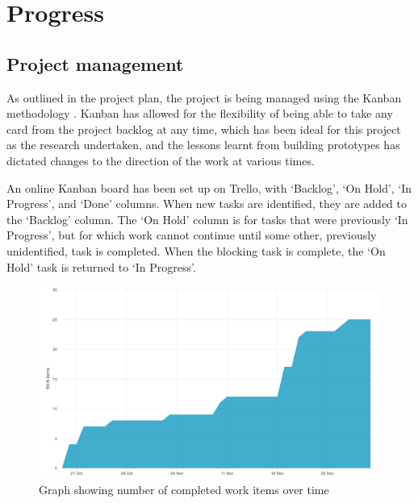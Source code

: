 \chapter{Progress}




\section{Project management}

As outlined in the project plan, the project is being managed using the Kanban methodology \cite{stellman2014learning}. Kanban has allowed for the flexibility of being able to take any card from the project backlog at any time, which has been ideal for this project as the research undertaken, and the lessons learnt from building prototypes has dictated changes to the direction of the work at various times. 

An online Kanban board has been set up on Trello, with `Backlog', `On Hold', `In Progress', and `Done' columns. When new tasks are identified, they are added to the `Backlog' column. The `On Hold' column is for tasks that were previously `In Progress', but for which work cannot continue until some other, previously unidentified, task is completed. When the blocking task is complete, the `On Hold' task is returned to `In Progress'.

\begin{figure}[h!]
  \centering
  \includegraphics[width=\textwidth]{images/burnup.png}
  \caption{Graph showing number of completed work items over time}
  \label{fig:burnup}
\end{figure}

